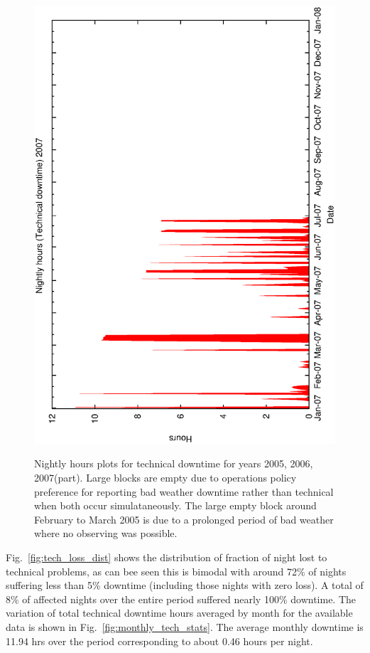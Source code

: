 \begin{figure}[htbp]
\begin{center}
{    \includegraphics[scale=0.3, angle=-90]{figures/ecs/met_nightly_stats_tech2007.eps} 
    \label{fig:nightly_tech2007}
  }
\caption[Nightly hours plots for technical downtime for years 2005, 2006, 2007(part).]{Nightly hours plots for technical downtime for years 2005, 2006, 2007(part). Large blocks are empty due to operations policy preference for reporting bad weather downtime rather than technical when both occur simulataneously. The large empty block around February to March 2005 is due to a prolonged period of bad weather where no observing was possible.}
\end{center}
\label{fig:met_nightly_tech}
\end{figure}


Fig.~\ref{fig:tech_loss_dist} shows the distribution of fraction of night lost to technical problems, as can bee seen this is bimodal with around 72\% of nights suffering less than 5\% downtime (including those nights with zero loss). A total of 8\% of affected nights over the entire period suffered nearly 100\% downtime.  The variation of total technical downtime hours averaged by month for the available data is shown in Fig.~\ref{fig:monthly_tech_stats}. The average monthly downtime is 11.94 hrs over the period corresponding to about 0.46 hours per night.

